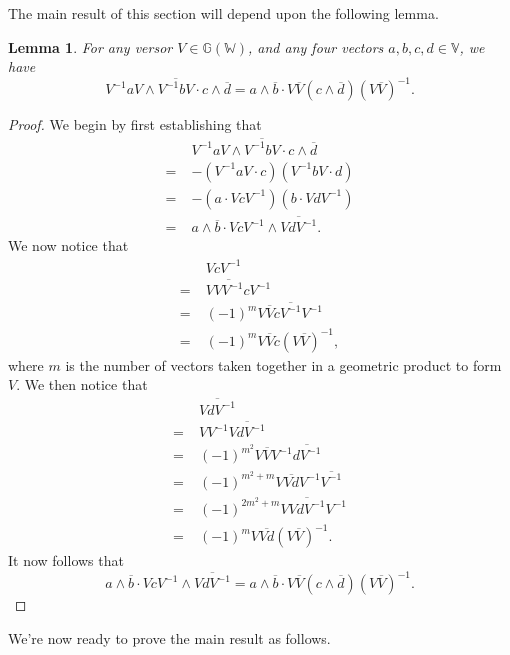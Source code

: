 \documentclass{birkjour}
\newtheorem{lem}[thm]{Lemma}
\theoremstyle{definition}
\theoremstyle{remark}
\numberwithin{equation}{section}
\newcommand{\G}{\mathbb{G}}
\newcommand{\V}{\mathbb{V}}
\newcommand{\W}{\mathbb{W}}
\begin{document}
The main result of this section will depend upon the following lemma.
\begin{lem}\label{lma_versor_transfer}
For any versor $V\in\G(\W)$, and any four vectors $a,b,c,d\in\V$, we have
\begin{equation}
V^{-1}aV\wedge\overline{V^{-1}bV}\cdot c\wedge\overline{d} =
a\wedge\overline{b}\cdot V\overline{V}(c\wedge\overline{d})(V\overline{V})^{-1}.
\end{equation}
\end{lem}
\begin{proof}
We begin by first establishing that
\begin{align}
 & V^{-1}aV\wedge\overline{V^{-1}bV}\cdot c\wedge\overline{d} \\
=\;& -(V^{-1}aV\cdot c)(V^{-1}bV\cdot d) \\
=\;& -(a\cdot VcV^{-1})(b\cdot VdV^{-1}) \\
=\;& a\wedge\overline{b}\cdot VcV^{-1}\wedge\overline{VdV^{-1}}.
\end{align}
We now notice that
\begin{align}
& VcV^{-1} \\
=\;& V\overline{VV^{-1}}cV^{-1} \\
=\;& (-1)^m V\overline{V}c\overline{V^{-1}}V^{-1} \\
=\;& (-1)^m V\overline{V}c(V\overline{V})^{-1},
\end{align}
where $m$ is the number of vectors taken together in a geometric
product to form $V$.  We then notice that
\begin{align}
& \overline{VdV^{-1}} \\
=\;& VV^{-1}\overline{VdV^{-1}} \\
=\;& (-1)^{m^2}V\overline{V}V^{-1}\overline{dV^{-1}} \\
=\;&(-1)^{m^2+m}V\overline{Vd}V^{-1}\overline{V^{-1}} \\
=\;&(-1)^{2m^2+m}V\overline{VdV^{-1}}V^{-1} \\
=\;&(-1)^mV\overline{Vd}(V\overline{V})^{-1}.
\end{align}
It now follows that
\begin{equation}
a\wedge\overline{b}\cdot VcV^{-1}\wedge\overline{VdV^{-1}} =
a\wedge\overline{b}\cdot V\overline{V}(c\wedge\overline{d})(V\overline{V})^{-1}.
\end{equation}
\end{proof}
We're now ready to prove the main result as follows.
\end{document}
